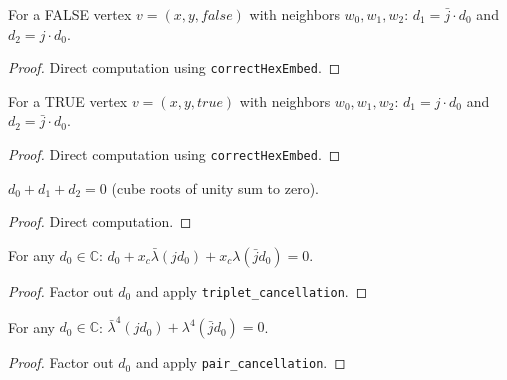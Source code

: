 \begin{lemma}
\begin{lemma}\label{lem:dir_rot_false}
\leanok
{}
  For a FALSE vertex $v = (x, y, \mathit{false})$ with neighbors
  $w_0, w_1, w_2$:
  $d_1 = \bar{j} \cdot d_0$ and $d_2 = j \cdot d_0$.
\end{lemma}
\begin{proof}\leanok
  Direct computation using \texttt{correctHexEmbed}.
\end{proof}

\begin{lemma}\label{lem:dir_rot_true}
\leanok
{}
  For a TRUE vertex $v = (x, y, \mathit{true})$ with neighbors
  $w_0, w_1, w_2$:
  $d_1 = j \cdot d_0$ and $d_2 = \bar{j} \cdot d_0$.
\end{lemma}
\begin{proof}\leanok
  Direct computation using \texttt{correctHexEmbed}.
\end{proof}

\begin{lemma}\label{lem:dir_sum}
\leanok
{}
  $d_0 + d_1 + d_2 = 0$ (cube roots of unity sum to zero).
\end{lemma}
\begin{proof}\leanok Direct computation. \end{proof}

\begin{lemma}\label{lem:triplet_geom}
\leanok
{}
  For any $d_0 \in \mathbb{C}$:
  $d_0 + x_c \bar{\lambda} (j d_0) + x_c \lambda (\bar{j} d_0) = 0$.
\end{lemma}
\begin{proof}\leanok
  Factor out $d_0$ and apply \texttt{triplet\_cancellation}.
\end{proof}

\begin{lemma}\label{lem:pair_geom}
\leanok
{}
  For any $d_0 \in \mathbb{C}$:
  $\bar{\lambda}^4 (j d_0) + \lambda^4 (\bar{j} d_0) = 0$.
\end{lemma}
\begin{proof}\leanok
  Factor out $d_0$ and apply \texttt{pair\_cancellation}.
\end{proof}


\end{lemma}

